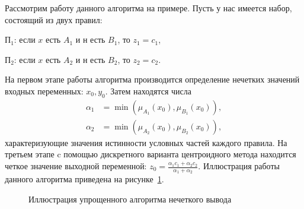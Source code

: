 Рассмотрим работу данного алгоритма на примере.
Пусть у нас имеется набор, состоящий из двух правил: \par
\( \text{П}_1 \): если \( x \) есть \( A_1 \) и \( н \) есть \( B_1 \), то \( z_1 = c_1 \), \par
\( \text{П}_2 \): если \( x \) есть \( A_2 \) и \( н \) есть \( B_2 \), то \( z_2 = c_2 \).

На первом этапе работы алгоритма производится определение нечетких значений входных переменных:
\( x_0, y_0 \). Затем находятся числа
\[
  \begin{aligned}
    \alpha_1 &= \min(\mu_{A_1}(x_0), \mu_{B_1}(x_0)), \\
    \alpha_2 &= \min(\mu_{A_2}(x_0), \mu_{B_2}(x_0)),
  \end{aligned}
\]
характеризующие значения истинности условных частей каждого правила.
На третьем этапе c помощью дискретного варианта центроидного метода
находится четкое значение выходной переменной:
\( z_0 = \frac{\alpha_1 c_1 + \alpha_2 c_2}{\alpha_1 + \alpha_2} \).
Иллюстрация работы данного алгоритма приведена на рисунке~\ref{fig:algo_simple}.

\begin{figure}[h!]
  \centering
  \caption{Иллюстрация упрощенного алгоритма нечеткого вывода}
  \label{fig:algo_simple}
\end{figure}